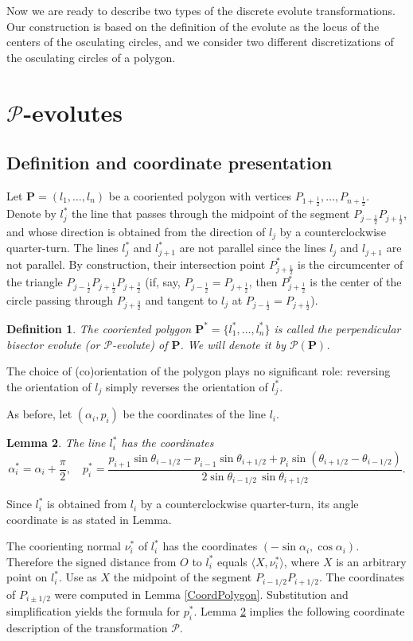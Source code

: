 \documentclass[12pt]{article}
\makeatletter
\newtheorem{lemma}{Lemma}[section]
\newtheorem{definition}[lemma]{Definition}
\renewenvironment{proof}[1][\proofname] 
{\par\pushQED{\qed}\normalfont\topsep6\p@\@plus6\p@\relax\trivlist\item[\hskip\labelsep\bfseries#1\@addpunct{.}]\ignorespaces}{\popQED\endtrivlist\@endpefalse}
\newcommand{\Pev}{\mathcal{P}}
\renewcommand{\P}{\mathbf{P}}
\makeatother
\begin{document}
Now we are ready to describe two types of the discrete evolute transformations. Our construction is based on the definition of the evolute as the locus of the centers of the osculating circles, and we consider two different discretizations of the osculating circles of a polygon.


\section{$\Pev$-evolutes}\label{P-evo}
\subsection{Definition and coordinate presentation}\label{DefP-evo}
Let $\P=(l_1, \ldots, l_n)$ be a cooriented polygon with vertices $P_{1+\frac12}, \ldots, P_{n+\frac12}$. Denote by $l_j^*$ the line that passes through the midpoint of the segment $P_{j-\frac12}P_{j+\frac12}$, and whose direction is obtained from the direction of $l_j$ by a counterclockwise quarter-turn. The lines $l^*_j$ and $l^*_{j+1}$ are not parallel since the lines $l_j$ and $l_{j+1}$ are not parallel. By construction, their intersection point $P^*_{j+\frac12}$ is the circumcenter of the triangle $P_{j-\frac12}P_{j+\frac12}P_{j+\frac32}$ (if, say, $P_{j-\frac12} = P_{j+\frac12}$, then $P^*_{j+\frac12}$ is the center of the circle passing through $P_{j+\frac32}$ and tangent to $l_j$ at $P_{j-\frac12} = P_{j+\frac12}$). 

\begin{definition}
\label{Pevo}
The cooriented polygon $\P^*=\{l^*_1, \ldots, l^*_n\}$ is called the \emph{perpendicular bisector evolute} (or  $\Pev$-evolute) of $\P$. We will denote it by $\Pev(\P)$.
\end{definition}

The choice of (co)orientation of the polygon plays no significant role: reversing the orientation of $l_j$ simply reverses the orientation of $l^*_j$.

As before, let $(\alpha_i, p_i)$ be the coordinates of the line $l_i$.
\begin{lemma}
\label{ParamPBisect}
The line $l^*_i$ has the coordinates
\[
\alpha_i^*=\alpha_i+\frac{\pi}{2}, \quad p_i^*=\frac{p_{i+1} \sin \theta_{i-1/2} - p_{i-1} \sin \theta_{i+1/2} + p_i \sin (\theta_{i+1/2} - \theta_{i-1/2})}{2 \sin \theta_{i-1/2}\, \sin \theta_{i+1/2}}.
\]
\end{lemma}
\begin{proof}
Since $l^*_i$ is obtained from $l_i$ by a counterclockwise quarter-turn, its angle coordinate is as stated in Lemma.

The coorienting normal $\nu^*_i$ of $l^*_i$ has the coordinates $(-\sin \alpha_i, \cos \alpha_i)$. Therefore the signed distance from $O$ to $l^*_i$ equals $\langle X, \nu^*_i \rangle$, where $X$ is an arbitrary point on $l^*_i$. Use as $X$ the midpoint of the segment $P_{i-1/2}P_{i+1/2}$. The coordinates of $P_{i\pm 1/2}$ were computed in Lemma \ref{CoordPolygon}. Substitution and simplification yields the formula for $p^*_i$.
\end{proof}
Lemma \ref{ParamPBisect} implies the following coordinate description of the transformation $\Pev$.
\end{document}
